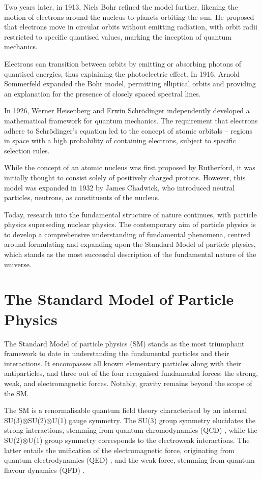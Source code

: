 \documentclass[bachelor,ngerman,english]{GAUBM}
\begin{document}
Two years later, in 1913, Niels Bohr refined the model further, likening the motion of electrons around the nucleus to planets orbiting the sun. He proposed that electrons move in circular orbits without emitting radiation, with orbit radii restricted to specific quantised values, marking the inception of quantum mechanics.

Electrons can transition between orbits by emitting or absorbing photons of quantised energies, thus explaining the photoelectric effect. In 1916, Arnold Sommerfeld expanded the Bohr model, permitting elliptical orbits and providing an explanation for the presence of closely spaced spectral lines.

In 1926, Werner Heisenberg and Erwin Schrödinger independently developed a mathematical framework for quantum mechanics. The requirement that electrons adhere to Schrödinger's equation led to the concept of atomic orbitals – regions in space with a high probability of containing electrons, subject to specific selection rules.

While the concept of an atomic nucleus was first proposed by Rutherford, it was initially thought to consist solely of positively charged protons. However, this model was expanded in 1932 by James Chadwick, who introduced neutral particles, neutrons, as constituents of the nucleus.

Today, research into the fundamental structure of nature continues, with particle physics superseding nuclear physics. The contemporary aim of particle physics is to develop a comprehensive understanding of fundamental phenomena, centred around formulating and expanding upon the Standard Model of particle physics, which stands as the most successful description of the fundamental nature of the universe.


\chapter{The Standard Model of Particle Physics}
\label{ch:standard_model}

The Standard Model of particle physics (SM) stands as the most triumphant framework to date in understanding the fundamental particles and their interactions. It encompasses all known elementary particles along with their antiparticles, and three out of the four recognised fundamental forces: the strong, weak, and electromagnetic forces. Notably, gravity remains beyond the scope of the SM.

The SM is a renormalisable quantum field theory characterised by an internal SU(3)$\otimes$SU(2)$\otimes$U(1) gauge symmetry. The SU(3) group symmetry elucidates the strong interactions, stemming from quantum chromodynamics (QCD) \cite{qcd}, while the SU(2)$\otimes$U(1) group symmetry corresponds to the electroweak interactions. The latter entails the unification of the electromagnetic force, originating from quantum electrodynamics (QED) \cite{qed01, qed02, qed03}, and the weak force, stemming from quantum flavour dynamics (QFD) \cite{qft}.
\end{document}
